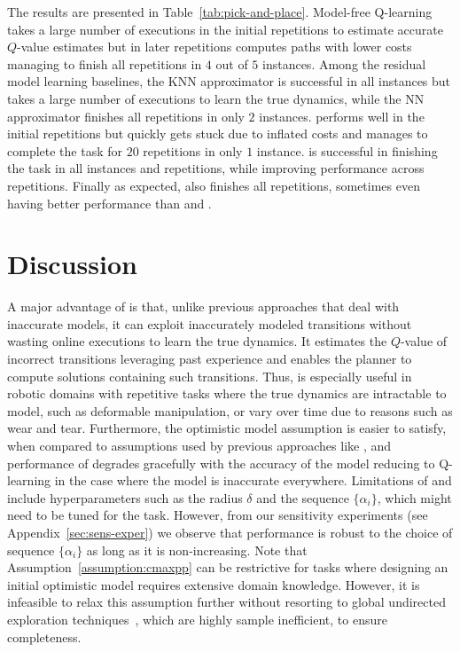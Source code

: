 The results are presented in Table~\ref{tab:pick-and-place}. 
Model-free Q-learning takes a large number of executions in the
initial repetitions to estimate accurate $Q$-value estimates but in
later repetitions computes paths with lower costs managing to finish all
repetitions in $4$ out of $5$ instances. Among the residual model
learning baselines, the KNN approximator is successful in all
instances but takes a large number of executions to learn the true
dynamics, while the NN approximator finishes all repetitions in only
$2$ instances. \cmax{} performs well in the initial repetitions but
quickly gets stuck due to inflated costs and manages to complete the
task for $20$ repetitions in only $1$ instance. \cmaxpp{} is successful in
finishing the 
task in all instances and repetitions, while improving performance
across repetitions. Finally as expected, \acmaxpp{} also finishes all
repetitions, sometimes even having better performance than \cmax{} and
\cmaxpp{}.



\section{Discussion}
\label{sec:disc-concl}

A major advantage of \cmaxpp{} is that, unlike previous approaches
that deal with inaccurate models, it can exploit inaccurately modeled
transitions without wasting online executions to learn the true
dynamics. It estimates the $Q$-value of incorrect transitions
leveraging past experience and enables the planner to compute solutions
containing such transitions. Thus, \cmaxpp{} is especially useful in
robotic domains with repetitive tasks where the true dynamics are
intractable to model, such as deformable manipulation, or vary
over time due to reasons such as wear and tear. Furthermore, the optimistic model assumption is
easier to satisfy, when compared to assumptions used by previous
approaches like \cmax{}, and performance of \cmaxpp{} degrades
gracefully with the accuracy of the model reducing to Q-learning in
the case where the model is inaccurate everywhere.
Limitations of
\cmaxpp{} and \acmaxpp{} include hyperparameters such as the
radius $\delta$ and the sequence $\{\alpha_i\}$, which might need to
be tuned for the task.
However, from our sensitivity experiments (see Appendix~\ref{sec:sens-exper}) we observe
that \acmaxpp{} performance is robust to the choice of sequence
$\{\alpha_i\}$ as long as it is non-increasing.
Note that Assumption~\ref{assumption:cmaxpp} can
be restrictive for tasks where designing an initial optimistic
model requires extensive domain
knowledge. However, it is infeasible to relax this assumption further
without resorting to global undirected exploration
techniques~\cite{Thrun-1992-15850}, which are highly sample
inefficient, to ensure completeness.

